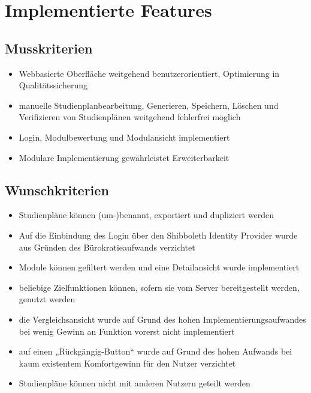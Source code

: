 \section{Implementierte Features}
\subsection{Musskriterien}
\begin{itemize}[nosep]
	\item Webbasierte Oberfläche weitgehend benutzerorientiert, Optimierung in Qualitätssicherung
	\item manuelle Studienplanbearbeitung, Generieren, Speichern, Löschen und Verifizieren von Studienplänen weitgehend fehlerfrei möglich
	\item Login, Modulbewertung und Modulansicht implementiert
	\item Modulare Implementierung gewährleistet Erweiterbarkeit
	\end{itemize}
\subsection{Wunschkriterien}
	\begin{itemize}[nosep]
	\item Studienpläne können (um-)benannt, exportiert und dupliziert werden
	\item Auf die Einbindung des Login über den Shibboleth Identity Provider wurde aus Gründen des Bürokratieaufwands verzichtet
	\item Module können gefiltert werden und eine Detailansicht wurde implementiert
	\item beliebige Zielfunktionen können, sofern sie vom Server bereitgestellt werden, genutzt werden
	\item die Vergleichsansicht wurde auf Grund des hohen Implementierungsaufwandes bei wenig Gewinn an Funktion vorerst nicht implementiert
	\item  auf einen „Rückgängig-Button“ wurde auf Grund des hohen Aufwands bei kaum existentem Komfortgewinn für den Nutzer verzichtet
	\item Studienpläne können nicht mit anderen Nutzern geteilt werden
	\end{itemize}